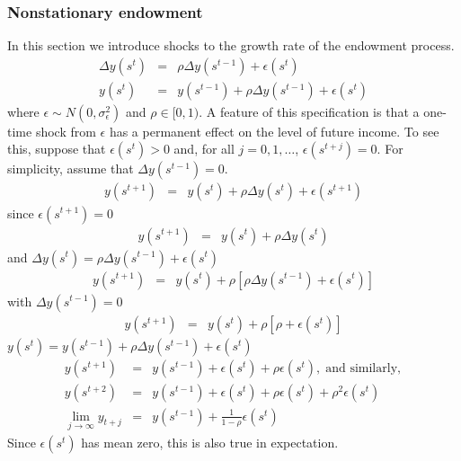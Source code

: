 \documentclass[11pt,pdftex,twoside,letterpaper]{exam}
\begin{document}
\subsubsection{Nonstationary endowment} \label{sec:nonstationary-shocks}
In this section we introduce shocks to the growth rate of the endowment process.
\begin{eqnarray}
  \Delta y(s^t) &=& \rho \Delta y(s^{t-1}) + \epsilon(s^t)\\
  y(s^t) &=& y(s^{t-1})+\rho \Delta y(s^{t-1}) + \epsilon(s^t)
\end{eqnarray}
where $\epsilon \sim N(0,\sigma^2_\epsilon)$ and $\rho \in [0,1)$. A feature of this specification is that a one-time shock from $\epsilon$ has a permanent effect on the level of future income. To see this, suppose that $\epsilon(s^t)>0$ and, for all $j=0,1,\ldots$, $\epsilon(s^{t+j})=0$.  For simplicity, assume that $\Delta y(s^{t-1})=0$.
\begin{eqnarray}
  y(s^{t+1}) &=& y(s^{t})+\rho \Delta y(s^{t}) + \epsilon(s^{t+1})
\end{eqnarray}
since $\epsilon(s^{t+1})=0$
\begin{eqnarray}
  y(s^{t+1}) &=& y(s^{t})+\rho \Delta y(s^{t})
\end{eqnarray}
and $\Delta y(s^t) = \rho \Delta y(s^{t-1}) + \epsilon(s^t)$
\begin{eqnarray}
  y(s^{t+1}) &=& y(s^{t})+\rho \left[ \rho \Delta y(s^{t-1}) + \epsilon(s^t) \right]
\end{eqnarray}
with $\Delta y(s^{t-1})=0$
\begin{eqnarray}
  y(s^{t+1}) &=& y(s^{t})+\rho \left[ \rho  + \epsilon(s^t) \right]
\end{eqnarray}
 $y(s^t) = y(s^{t-1})+\rho \Delta y(s^{t-1}) + \epsilon(s^t)$
\begin{eqnarray}
  y(s^{t+1}) &=& y(s^{t-1}) + \epsilon(s^t)+ \rho\epsilon(s^t), \; \textrm{and similarly},\\
  y(s^{t+2}) &=& y(s^{t-1}) + \epsilon(s^t)+ \rho\epsilon(s^t) + \rho^2\epsilon(s^t)\\
  \lim_{j \to \infty} y_{t+j} &=& y(s^{t-1}) + \frac{1}{1-\rho}\epsilon(s^t)
\end{eqnarray}
Since $\epsilon(s^t)$ has mean zero, this is also true in expectation.
\end{document}
